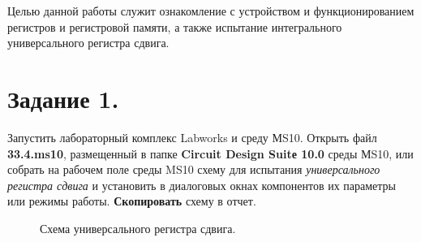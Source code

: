 \documentclass[spec, och, otchet, hidelinks]{SCWorks}
\begin{document}


\tableofcontents






\intro

\par Целью данной работы служит ознакомление с устройством и функционированием регистров и регистровой памяти, а также испытание интегрального 
универсального регистра сдвига.

\newpage

\section*{Задание 1.}

Запустить лабораторный комплекс Labworks и среду МS10. Открыть файл \textbf{33.4.ms10}, размещенный в папке \textbf{Circuit Design Suitе 10.0} среды 
МS10, или собрать на рабочем поле среды MS10 схему для испытания \textit{универсального регистра сдвига} и установить в диалоговых окнах компонентов их 
параметры или режимы работы. \textbf{Скопировать} схему в отчет.

\begin{figure}[h]
	\caption{Схема универсального регистра сдвига.}
\end{figure}
\end{document}
